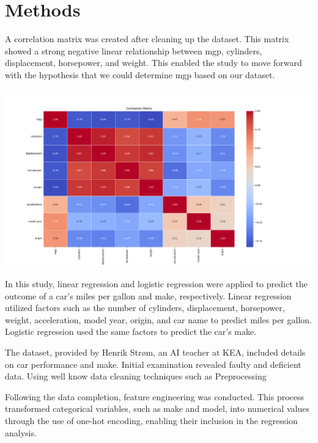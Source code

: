 \documentclass[a4paper, twocolumn]{article}
\begin{document}

\section{Methods\label{sec:Methods}}

A correlation matrix was created after cleaning up the dataset. This matrix showed a strong negative linear relationship between mgp, cylinders, displacement, horsepower, and weight. This enabled the study to move forward with the hypothesis that we could determine mgp based on our dataset. 

\includegraphics[width=0.9\linewidth]{images/Correlation.png}


In this study, linear regression and logistic regression were applied to predict the outcome of a car's miles per gallon and make, respectively. Linear regression utilized factors such as the number of cylinders, displacement, horsepower, weight, acceleration, model year, origin, and car name to predict miles per gallon. Logistic regression used the same factors to predict the car's make.

The dataset, provided by Henrik Strøm, an AI teacher at KEA, included details on car performance and make. Initial examination revealed faulty and deficient data. Using well know data cleaning techniques such as Preprocessing \textcite{hellerstein2013quantitative}

Following the data completion, feature engineering was conducted. This process transformed categorical variables, such as make and model, into numerical values through the use of one-hot encoding, enabling their inclusion in the regression analysis.
\end{document}
